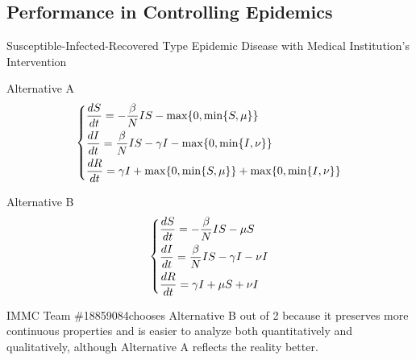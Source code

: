 \documentclass[8pt, hyperref={colorlinks=true}]{beamer}
\newcommand{\team}{IMMC Team \#18859084\hphantom{a}}
\begin{document}
\subsection{Performance in Controlling Epidemics}
\begin{frame}{Susceptible-Infected-Recovered Type Epidemic Disease with Medical Institution's Intervention}
\begin{block}{Alternative A}
\[
\begin{dcases}
\frac{dS}{dt}=-\frac{\beta}{N}IS-\max\{0,\min\{S,\mu\}\}\\
\frac{dI}{dt}=\frac{\beta}{N}IS-\gamma I-\max\{0,\min\{I,\nu\}\}\\
\frac{dR}{dt}=\gamma I+\max\{0,\min\{S,\mu\}\}+\max\{0,\min\{I,\nu\}\}
\end{dcases}
\]
\end{block}
\begin{block}{Alternative B}
\[
\begin{dcases}
\frac{dS}{dt}=-\frac{\beta}{N}IS-\mu S\\
\frac{dI}{dt}=\frac{\beta}{N}IS-\gamma I-\nu I\\
\frac{dR}{dt}=\gamma I+\mu S+\nu I
\end{dcases}
\]
\end{block}
\team chooses Alternative B out of 2 because it preserves more continuous properties and is easier to analyze both quantitatively and qualitatively, although Alternative A reflects the reality better.
\end{frame}

\end{document}
